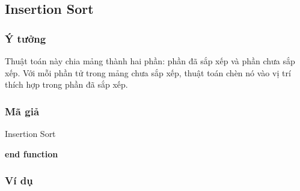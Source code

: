 \subsection{Insertion Sort}


\subsubsection{Ý tưởng}

Thuật toán này chia mảng thành hai phần: phần đã sắp xếp và 
phần chưa sắp xếp. Với mỗi phần tử trong mảng chưa sắp xếp, thuật toán chèn nó vào vị trí thích hợp trong phần đã sắp xếp. \cite[p.~90]{hoang2008}

\subsubsection{Mã giả}

\begin{algorithm}[H]
\caption{Insertion Sort \cite{code-insertion}}
\textbf{end function}
\end{algorithm}

\subsubsection{Ví dụ}

